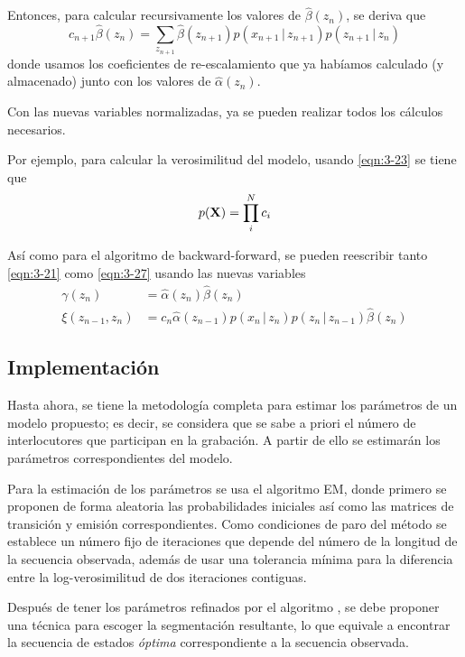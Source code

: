 Entonces, para calcular recursivamente los valores de $\hat \beta(z_n)$, se deriva que 
\begin{equation}
  c_{n+1} \hat \beta(z_n) = \sum_{z_{n+1}} \hat \beta(z_{n+1})
    p(x_{n+1} \,|\, z_{n+1}) p(z_{n+1} \,|\, z_n)    
  \label{eqn:3-28}
\end{equation}
donde usamos los coeficientes de re-escalamiento que ya habíamos calculado (y almacenado) junto con los valores de $\hat \alpha(z_n)$.

Con las nuevas variables normalizadas, ya se pueden realizar todos los cálculos necesarios. 

Por ejemplo, para calcular la verosimilitud del modelo, usando \eqref{eqn:3-23} se tiene que
\begin{equation}
  p(\textbf{X}) =  \prod_i^N c_i
  \label{eqn:3-29}
\end{equation}

Así como para el algoritmo de backward-forward, se pueden reescribir tanto \eqref{eqn:3-21} como \eqref{eqn:3-27} usando las nuevas variables 
\begin{align}
  \gamma(z_n) &= \hat \alpha(z_n) \hat \beta(z_n) \\
  \xi(z_{n-1}, z_n) &= c_n \hat \alpha(z_{n-1}) p(x_n \,|\, z_n) 
      p(z_n \,|\, z_{n-1}) \hat \beta(z_n) 
  \label{eqn:3-30}      
\end{align}

\subsection{Implementación}

Hasta ahora, se tiene la metodología completa para estimar los parámetros de un modelo propuesto; es decir, se considera que se sabe a priori el número de interlocutores que participan en la grabación. A partir de ello se estimarán los parámetros correspondientes del modelo.

Para la estimación de los parámetros se usa el algoritmo \ac{EM}, donde primero se proponen de forma aleatoria las probabilidades iniciales así como las matrices de transición y emisión correspondientes. Como condiciones de paro del método se establece un número fijo de iteraciones que depende del número de la longitud de la secuencia observada, además de usar una tolerancia mínima para la diferencia entre la log-verosimilitud de dos iteraciones contiguas. 

Después de tener los parámetros refinados por el algoritmo \abf, se debe proponer una técnica para escoger la segmentación resultante, lo que equivale a encontrar la secuencia de estados \textit{óptima} correspondiente a la secuencia observada.

